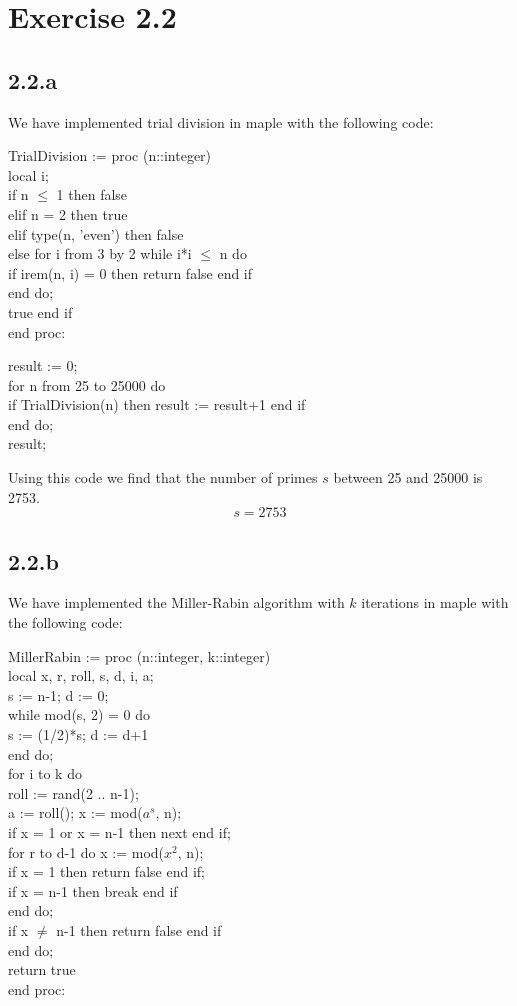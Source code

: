 \documentclass[11pt]{report}
\begin{document}
\section*{Exercise 2.2}
\subsection*{2.2.a}
We have implemented trial division in maple with the following code:
\begin{mapleinput}
TrialDivision := proc (n::integer) \\
local i; \\
if n $\leq$ 1 then false \\
elif n = 2 then true \\
elif type(n, 'even') then false \\
else for i from 3 by 2 while i*i $\leq$ n do \\
if irem(n, i) = 0 then return false end if \\
end do; \\
true end if \\
end proc:
\end{mapleinput}

\begin{mapleinput}
result := 0; \\
for n from 25 to 25000 do \\
if TrialDivision(n) then result := result+1 end if \\
end do; \\
result;
\end{mapleinput}
Using this code we find that the number of primes $s$ between 25 and 25000 is 2753.
$$s = 2753$$

\subsection*{2.2.b}
We have implemented the Miller-Rabin algorithm with $k$ iterations in maple with the following code:
\begin{mapleinput}
MillerRabin := proc (n::integer, k::integer) \\
local x, r, roll, s, d, i, a; \\
s := n-1; d := 0; \\
while mod(s, 2) = 0 do \\
s := (1/2)*s; d := d+1 \\
end do; \\
for i to k do \\
roll := rand(2 .. n-1); \\
a := roll(); x := mod($a^s$, n); \\
if x = 1 or x = n-1 then next end if; \\
for r to d-1 do x := mod($x^2$, n); \\
if x = 1 then return false end if; \\
if x = n-1 then break end if \\
end do; \\
if x $\ne$ n-1 then return false end if \\
end do; \\
return true \\
end proc:
\end{mapleinput}
\end{document}
